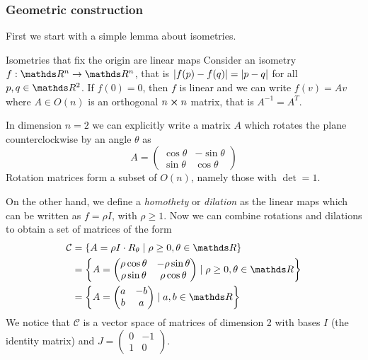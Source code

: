 \documentclass[12pt]{extarticle}
\begin{document}
\subsubsection{Geometric construction}

First we start with a simple lemma about isometries.

\begin{lemma}{Isometries that fix the origin are linear maps}{}
	Consider an isometry $f: \R^n \to \R^n$,
	that is $\abs{f(p) - f(q)} = \abs{p-q}$ for all $p, q \in \R^2$.
	If $f(0) = 0$, then $f$ is linear and we can write $f(v) = Av$
	where $A \in O(n)$ is an orthogonal $n\cross n$ matrix, that is $A^{-1} = A^T$.
\end{lemma}

In dimension $n = 2$ we can explicitly write a matrix $A$ which rotates the plane counterclockwise
by an angle $\theta$ as
\begin{equation}
	A = \begin{pmatrix}
		\cos \theta & -\sin \theta \\
		\sin \theta & \cos \theta
	\end{pmatrix}
\end{equation}
Rotation matrices form a subset of $O(n)$, namely those with $\det = 1$.

On the other hand, we define a \emph{homothety} or \emph{dilation} as the linear maps which
can be written as $f = \rho I$, with $\rho \geq 1$.
Now we can combine rotations and dilations to obtain a set of matrices of the form
\begin{align}
	\mathcal C & = \left\{ A = \rho I \cdot R_\theta \mid \rho \geq 0, \theta \in \R\right\} \\
	           & =  \left\{ A = \begin{pmatrix}
		                            \rho \cos \theta & - \rho \sin \theta \\
		                            \rho \sin \theta & \rho \cos \theta
	                            \end{pmatrix}
	\mid \rho \geq 0, \theta \in \R\right\}                                                  \\
	           & = \left\{ A = \begin{pmatrix}
		                           a & -b \\
		                           b & a
	                           \end{pmatrix}
	\mid a, b \in \R\right\}
\end{align}
We notice that $\mathcal C$ is a vector space of matrices of dimension 2 with bases
$I$ (the identity matrix) and $J = \begin{pmatrix} 0 & -1 \\ 1 & 0 \end{pmatrix}$.
\end{document}
